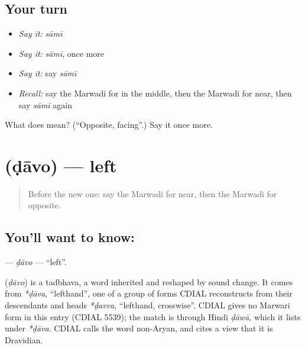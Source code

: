 \subsection*{Your turn}
\begin{itemize}
\raggedright
  \item \emph{Say it:} \emph{sāmī}
  \item \emph{Say it:} \emph{sāmī}, once more
  \item \emph{Say it:} say \emph{sāmī}
  \item \emph{Recall:} say the Marwadi for in the middle, then the Marwadi for near, then say \emph{sāmī} again
\end{itemize}

\begin{tcolorbox}[breakable,colback=teal!4,colframe=teal!35!black,title={Before you move on}]
What does  mean? (\textquotedblleft{}Opposite, facing\textquotedblright{}.) Say it once more.
\end{tcolorbox}
\section[\texorpdfstring{\mw{डावो} (ḍāvo)}{डावो (ḍāvo)}]{ (ḍāvo) — left}

\label{lesson:MW-C97-davo}



\begin{quote}
Before the new one: say the Marwadi for near, then the Marwadi for opposite.
\end{quote}

\subsection*{You'll want to know: }
\textbf{} — \emph{ḍāvo} — \textquotedblleft{}left\textquotedblright{}.

\begin{cousinweb}
\textbf{} (\emph{ḍāvo}) is a tadbhava, a word inherited and reshaped by sound change. It comes from \emph{*ḍāva}, \textquotedblleft{}lefthand\textquotedblright{}, one of a group of forms CDIAL reconstructs from their descendants and heads \emph{*ḍavva}, \textquotedblleft{}lefthand, crosswise\textquotedblright{}. CDIAL gives no Marwari form in this entry (CDIAL 5539); the match is through Hindi \emph{ḍāwā}, which it lists under \emph{*ḍāva}. CDIAL calls the word non-Aryan, and cites a view that it is Dravidian.
\end{cousinweb}

